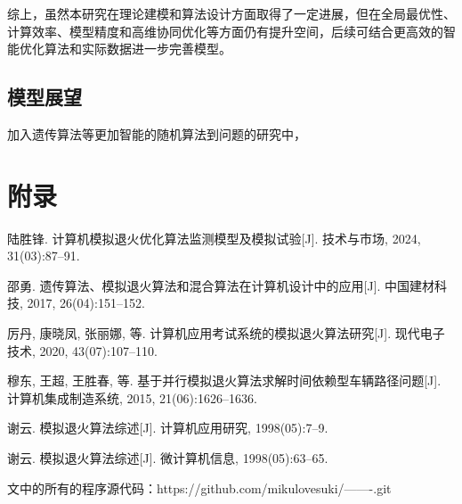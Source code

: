 \documentclass{article}
\begin{document}
综上，虽然本研究在理论建模和算法设计方面取得了一定进展，但在全局最优性、计算效率、模型精度和高维协同优化等方面仍有提升空间，后续可结合更高效的智能优化算法和实际数据进一步完善模型。

\subsection{模型展望}
加入遗传算法等更加智能的随机算法到问题的研究中，



\section*{附录}
\vspace{-1em}
\begin{thebibliography}{99}

陆胜锋. 计算机模拟退火优化算法监测模型及模拟试验[J]. 技术与市场, 2024, 31(03):87--91.

邵勇. 遗传算法、模拟退火算法和混合算法在计算机设计中的应用[J]. 中国建材科技, 2017, 26(04):151--152.

厉丹, 康晓凤, 张丽娜, 等. 计算机应用考试系统的模拟退火算法研究[J]. 现代电子技术, 2020, 43(07):107--110.

穆东, 王超, 王胜春, 等. 基于并行模拟退火算法求解时间依赖型车辆路径问题[J]. 计算机集成制造系统, 2015, 21(06):1626--1636.

谢云. 模拟退火算法综述[J]. 计算机应用研究, 1998(05):7--9.

谢云. 模拟退火算法综述[J]. 微计算机信息, 1998(05):63--65.

\end{thebibliography}

文中的所有的程序源代码：https://github.com/mikulovesuki/-------.git

\noindent
\end{document}
